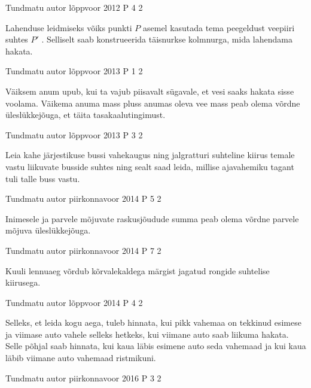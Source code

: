 \documentclass[11pt]{article}
\begin{document}
{%
{Tundmatu autor} %
{lõppvoor} %
{2012} %
{P 4} %
{2} %
{

\ifHint
Lahenduse leidmiseks võiks punkti $P$ asemel kasutada tema peegeldust veepiiri suhtes $P'$ . Selliselt saab konstrueerida täisnurkse kolmnurga, mida lahendama hakata.
\fi
}

{Tundmatu autor} %
{lõppvoor} %
{2013} %
{P 1} %
{2} %
{

\ifHint
Väiksem anum upub, kui ta vajub piisavalt sügavale, et vesi saaks hakata sisse voolama. Väikema anuma mass pluss anumas oleva vee mass peab olema võrdne üleslükkejõuga, et täita tasakaalutingimust.
\fi
}

{Tundmatu autor} %
{lõppvoor} %
{2013} %
{P 3} %
{2} %
{

\ifHint
Leia kahe järjestikuse bussi vahekaugus ning jalgratturi suhteline kiirus temale vastu liikuvate busside suhtes ning sealt saad leida, millise ajavahemiku tagant tuli talle buss vastu.
\fi
}

{Tundmatu autor} %
{piirkonnavoor} %
{2014} %
{P 5} %
{2} %
{

\ifHint
Inimesele ja parvele mõjuvate raskusjõudude summa peab olema võrdne parvele mõjuva üleslükkejõuga.
\fi
}

{Tundmatu autor} %
{piirkonnavoor} %
{2014} %
{P 7} %
{2} %
{

\ifHint
Kuuli lennuaeg võrdub kõrvalekaldega märgist jagatud rongide suhtelise kiirusega.
\fi
}

{Tundmatu autor} %
{lõppvoor} %
{2014} %
{P 4} %
{2} %
{

\ifHint
Selleks, et leida kogu aega, tuleb hinnata, kui pikk vahemaa on tekkinud esimese ja viimase auto vahele selleks hetkeks, kui viimane auto saab liikuma hakata. Selle põhjal saab hinnata, kui kaua läbis esimene auto seda vahemaad ja kui kaua läbib viimane auto vahemaad ristmikuni.
\fi
}

{Tundmatu autor} %
{piirkonnavoor} %
{2016} %
{P 3} %
{2} %
{

}}
\end{document}
